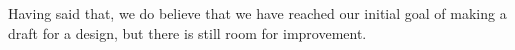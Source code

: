 Having said that, we do believe that we have reached our initial goal of making a draft for a design, but there is still room for improvement.
\newpage
